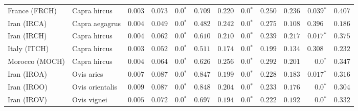 \documentclass{article}
\begin{document}
\begin{table*}[tb]
\begin{adjustbox}{width = 0.95\textwidth}
\begin{tabular}{||l|l|r||r|r|r||r|r|r||r|r|r||}
                \rowcolor{LIGHTGREY} France (FRCH)                  & Capra hircus        & $ 0.003$ & $ 0.073$ & $\bm{0.0{^*}}$                  & $ 0.709$                                                                     & $ 0.220$                      & $\bm{0.0{^*}}$ & $ 0.250$ & $ 0.236$ & $\bm{ 0.039{^*}}$ & $ 0.407$ \\
                \rowcolor{LIGHTGREY} Iran (IRCA)                    & Capra aegagrus      & $ 0.004$ & $ 0.049$ & $\bm{0.0{^*}}$                  & $ 0.482$                                                                     & $ 0.242$                      & $\bm{0.0{^*}}$ & $ 0.275$ & $ 0.108$ & $ 0.396~~$ & $ 0.186$ \\
                \rowcolor{LIGHTGREY} Iran (IRCH)                    & Capra hircus        & $ 0.004$ & $ 0.062$ & $\bm{0.0{^*}}$    & $ 0.610$                                                                     & $ 0.210$                      & $\bm{0.0{^*}}$ & $ 0.239$ & $ 0.217$ & $\bm{ 0.017{^*}}$ & $ 0.375$ \\
                \rowcolor{LIGHTGREY} Italy (ITCH)                   & Capra hircus        & $ 0.003$ & $ 0.052$ & $\bm{0.0{^*}}$    & $ 0.511$                                                                     & $ 0.174$                      & $\bm{0.0{^*}}$ & $ 0.199$ & $ 0.134$ & $ 0.308~~$ & $ 0.232$ \\
                \rowcolor{LIGHTGREY} Morocco (MOCH)                 & Capra hircus        & $ 0.004$ & $ 0.064$ & $\bm{0.0{^*}}$                  & $ 0.626$                                                                     & $ 0.256$                      & $\bm{0.0{^*}}$ & $ 0.292$ & $ 0.201$ & $\bm{0.0{^*}}$ & $ 0.347$ \\
                Iran (IROA)                                         & Ovis aries          & $ 0.007$ & $ 0.087$ & $\bm{0.0{^*}}$    & $ 0.847$ & $ 0.199$ & $\bm{0.0{^*}}$ & $ 0.228$ & $ 0.183$ & $\bm{ 0.017{^*}}$ & $ 0.316$ \\
                Iran (IROO)                                         & Ovis orientalis     & $ 0.009$ & $ 0.087$ & $\bm{0.0{^*}}$    & $ 0.848$ & $ 0.204$ & $\bm{0.0{^*}}$ & $ 0.233$ & $ 0.176$ & $\bm{0.0{^*}}$ & $ 0.304$ \\
                Iran (IROV)                                         & Ovis vignei         & $ 0.005$ & $ 0.072$ & $\bm{0.0{^*}}$    & $ 0.697$ & $ 0.194$ & $\bm{0.0{^*}}$ & $ 0.222$ & $ 0.192$ & $\bm{0.0{^*}}$ & $ 0.332$ \\

\end{tabular}
\end{adjustbox}
\end{table*}
\end{document}
